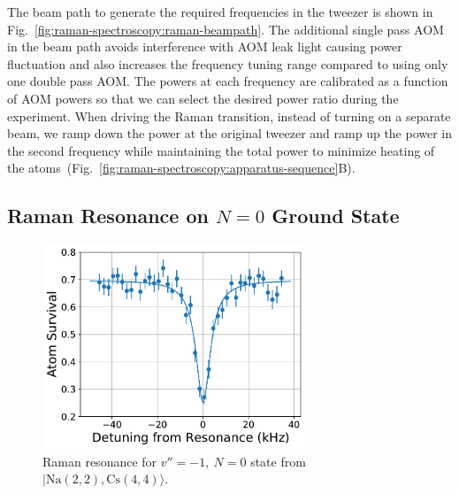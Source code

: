 The beam path to generate the required frequencies in the tweezer is shown in
Fig.~\ref{fig:raman-spectroscopy:raman-beampath}.
The additional single pass AOM in the beam path avoids interference
with AOM leak light causing power fluctuation and
also increases the frequency tuning range compared to using only one double pass AOM.
The powers at each frequency are calibrated as a function of AOM powers
so that we can select the desired power ratio during the experiment.
When driving the Raman transition, instead of turning on a separate beam,
we ramp down the power at the original tweezer and ramp up the power
in the second frequency while maintaining the total power to minimize heating of
the atoms~(Fig.~\ref{fig:raman-spectroscopy:apparatus-sequence}B).

\subsection{Raman Resonance on \texorpdfstring{$N=0$}{N=0} Ground State}
\label{ch:raman-spectroscopy:states:n0}

\begin{figure}
  \centering
  \includegraphics[width=0.7\textwidth]{figures/raman_spectroscopy_resonance.pdf}
  \caption[Raman resonance for $v''=-1,\ N=0$ state]{
    Raman resonance for $v''=-1,\ N=0$ state from $|\mathrm{Na(2, 2),Cs(4, 4)}\rangle$.
    \label{fig:raman-spectroscopy:resonance}}
\end{figure}


